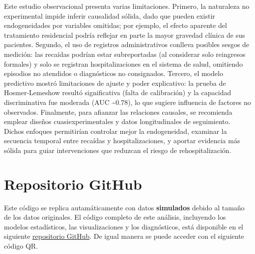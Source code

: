 \documentclass[
  spanish,
  10pt,
]{article}
\begin{document}
Este estudio observacional presenta varias limitaciones. Primero, la
naturaleza no experimental impide inferir causalidad sólida, dado que
pueden existir endogeneidades por variables omitidas; por ejemplo, el
efecto aparente del tratamiento residencial podría reflejar en parte la
mayor gravedad clínica de sus pacientes. Segundo, el uso de registros
administrativos conlleva posibles sesgos de medición: las recaídas
podrían estar subreportadas (al considerar solo reingresos formales) y
solo se registran hospitalizaciones en el sistema de salud, omitiendo
episodios no atendidos o diagnósticos no consignados. Tercero, el modelo
predictivo mostró limitaciones de ajuste y poder explicativo: la prueba
de Hosmer-Lemeshow resultó significativa (falta de calibración) y la
capacidad discriminativa fue moderada (AUC \textasciitilde0.78), lo que
sugiere influencia de factores no observados. Finalmente, para afianzar
las relaciones causales, se recomienda emplear diseños
cuasiexperimentales y datos longitudinales de seguimiento. Dichos
enfoques permitirían controlar mejor la endogeneidad, examinar la
secuencia temporal entre recaídas y hospitalizaciones, y aportar
evidencia más sólida para guiar intervenciones que reduzcan el riesgo de
rehospitalización.

\newpage

\section{Repositorio GitHub}\label{repositorio-github}

Este código se replica autamáticamente con datos \textbf{simulados}
debido al tamaño de los datos originales. El código completo de este
análisis, incluyendo los modelos estadísticos, las visualizaciones y los
diagnósticos, está disponible en el siguiente
\href{https://github.com/AmaruSimonAgueroJimenez/Econometria-DCCS}{repositorio
GitHub}. De igual manera se puede acceder con el siguiente código QR.
\end{document}

